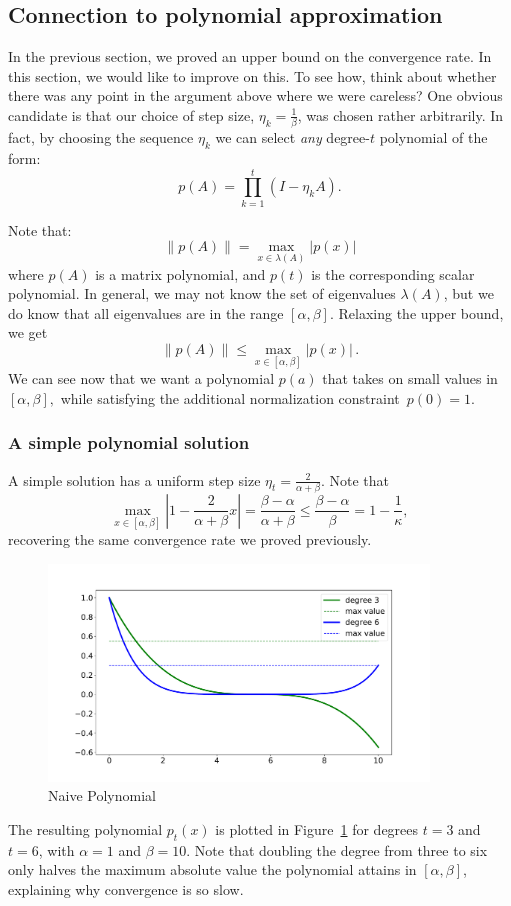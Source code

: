 \subsection{Connection to polynomial approximation}
In the previous section, we proved an upper bound on the convergence rate. In
this section, we would like to improve on this. To see how, think about 
whether there was any
point in the argument above where we were careless? One obvious candidate is that
our choice of step size, $\eta_k = \frac{1}{\beta}$, was chosen rather
arbitrarily. In fact, by choosing the sequence $\eta_k$ we can select
\textit{any} degree-$t$ polynomial of the form: 
\[
p(A) = \prod_{k=1}^t \left(I - \eta_k A\right).
\]

Note that:
\begin{equation*}
\left\|p(A)\right\| = \max_{x \in \lambda(A)} \left|p(x)\right|
\end{equation*}
where $p(A)$ is a matrix polynomial, and $p(t)$ is the corresponding scalar
polynomial. In general, we may not know the set of eigenvalues $\lambda(A)$, but
we do know that all eigenvalues are in the range $[\alpha, \beta].$ Relaxing
the upper bound, we get
\begin{equation*}
\left\|p(A)\right\| \le \max_{x \in [\alpha, \beta]} \left|p(x)\right|\,.
\end{equation*}
We can see now that we
want a polynomial $p(a)$ that takes on small values in $[\alpha, \beta],$ while 
satisfying the additional normalization constraint~$p(0) = 1.$ 

\subsubsection{A simple polynomial solution}
A simple solution has a uniform step size $\eta_t = \frac{2}{\alpha + \beta}$. 
Note that
\[
\max_{x \in [\alpha, \beta]} \left|1 - \frac{2}{\alpha + \beta} x\right| 
= \frac{\beta - \alpha}{\alpha + \beta} \leq \frac{\beta-\alpha}{\beta} =
1-\frac1\kappa,
\]
recovering the same convergence rate we proved previously.
\begin{figure}[h]
\includegraphics[width=0.9\textwidth]{figures/lecture6-naive_polynome.pdf}
\centering
\caption{Naive Polynomial}
\label{naive_p}
\end{figure}
%
The resulting polynomial $p_t(x)$ is plotted in Figure~\ref{naive_p} for degrees
$t = 3$ and $t = 6$, with $\alpha = 1$ and $\beta = 10$. Note that doubling the
degree from three to six only halves the maximum absolute value the polynomial
attains in $[\alpha,\beta]$, explaining why convergence is so slow.

